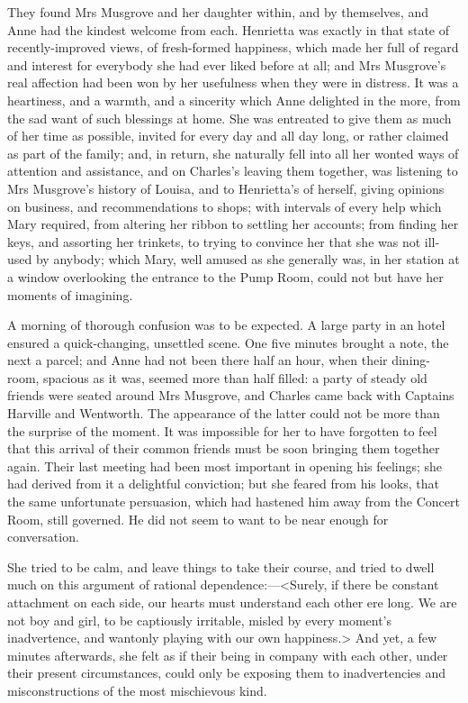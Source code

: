 They found Mrs Musgrove and her daughter within, and by themselves, and Anne had the kindest welcome from each. Henrietta was exactly in that state of recently-improved views, of fresh-formed happiness, which made her full of regard and interest for everybody she had ever liked before at all; and Mrs Musgrove's real affection had been won by her usefulness when they were in distress. It was a heartiness, and a warmth, and a sincerity which Anne delighted in the more, from the sad want of such blessings at home. She was entreated to give them as much of her time as possible, invited for every day and all day long, or rather claimed as part of the family; and, in return, she naturally fell into all her wonted ways of attention and assistance, and on Charles's leaving them together, was listening to Mrs Musgrove's history of Louisa, and to Henrietta's of herself, giving opinions on business, and recommendations to shops; with intervals of every help which Mary required, from altering her ribbon to settling her accounts; from finding her keys, and assorting her trinkets, to trying to convince her that she was not ill-used by anybody; which Mary, well amused as she generally was, in her station at a window overlooking the entrance to the Pump Room, could not but have her moments of imagining.

A morning of thorough confusion was to be expected. A large party in an hotel ensured a quick-changing, unsettled scene. One five minutes brought a note, the next a parcel; and Anne had not been there half an hour, when their dining-room, spacious as it was, seemed more than half filled: a party of steady old friends were seated around Mrs Musgrove, and Charles came back with Captains Harville and Wentworth. The appearance of the latter could not be more than the surprise of the moment. It was impossible for her to have forgotten to feel that this arrival of their common friends must be soon bringing them together again. Their last meeting had been most important in opening his feelings; she had derived from it a delightful conviction; but she feared from his looks, that the same unfortunate persuasion, which had hastened him away from the Concert Room, still governed. He did not seem to want to be near enough for conversation.

She tried to be calm, and leave things to take their course, and tried to dwell much on this argument of rational dependence:—<Surely, if there be constant attachment on each side, our hearts must understand each other ere long. We are not boy and girl, to be captiously irritable, misled by every moment's inadvertence, and wantonly playing with our own happiness.> And yet, a few minutes afterwards, she felt as if their being in company with each other, under their present circumstances, could only be exposing them to inadvertencies and misconstructions of the most mischievous kind.

